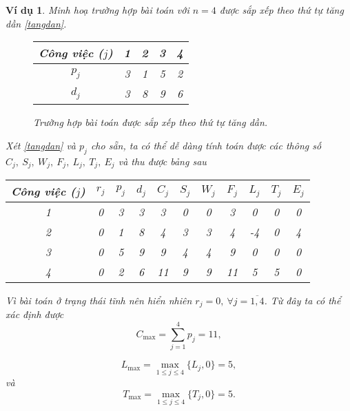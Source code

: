 \documentclass[12pt,a4paper]{report}
\newtheorem{vd}{Ví dụ}
\begin{document}
\begin{vd}
	Minh hoạ trường hợp bài toán với $n=4$ được sắp xếp theo thứ tự tăng dần \eqref{tangdan}.
	\begin{figure}[h!]
	\centering
	\begin{tabular}{|c | c c c c |} 
		\hline
		Công việc ($j$) & 1 & 2 & 3 & 4 \\
		\hline\hline
		$p_j$ & 3 & 1 & 5 & 2 \\
		$d_j$ & 3 & 8 & 9 & 6 \\
		\hline
	\end{tabular}
	\caption{\label{tangdan} Trường hợp bài toán được sắp xếp theo thứ tự tăng dần.}
	\end{figure}

	Xét \eqref{tangdan} và $p_j$ cho sẵn, ta có thể dễ dàng tính toán được các thông số $C_j, \: S_j, \: W_j, \: F_j, \: L_j, \: T_j, \: E_j$ và thu được bảng sau
\begin{table}[h!]
		\centering
		 \begin{tabular}{|c || c c c c c c c c c c|}
		 \hline
		 Công việc ($j$) & $r_j$ & $p_j$ & $d_j$ & $C_j$ & $S_j$ & $W_j$ & $F_j$ & $L_j$ & $T_j$ & $E_j$ \\
		 \hline
		 1 & 0 & 3 & 3 & 3 & 0 & 0 & 3 & 0 & 0 & 0 \\
		 \hline
		 2 & 0 & 1 & 8 & 4 & 3 & 3 & 4 & -4 & 0 & 4 \\
		 \hline
		 3 & 0 & 5 & 9 & 9 & 4 & 4 & 9 & 0 & 0 & 0 \\
		 \hline
		 4 & 0 & 2 & 6 & 11 & 9 & 9 & 11 & 5 & 5 & 0 \\
		 \hline
		 \end{tabular}
	\end{table}

Vì bài toán ở trạng thái tĩnh nên hiển nhiên $r_j = 0, \: \forall j=\overline{1,4}$. Từ đây ta có thể xác định được
\begin{equation*}
C_{\max} = \sum_{j=1}^4 p_j = 11,
\end{equation*}

\begin{equation*}
	L_{\max} = \max _{1 \leq j \leq 4} \{L_j, 0\} = 5,
\end{equation*}
và
\begin{equation*}
	T_{\max} = \max _{1 \leq j \leq 4} \{T_j, 0\} = 5.
\end{equation*}


\end{vd}
\end{document}
